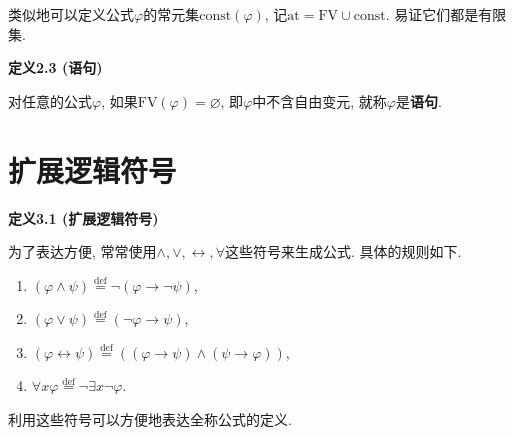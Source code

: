 \documentclass[UTF8]{ctexart}
\begin{document}
\vspace{10pt}

类似地可以定义公式$\varphi$的常元集$\mathrm{const}(\varphi)$,
记$\mathrm{at}=\mathrm{FV}\cup\mathrm{const}$. 易证它们都是有限集.

\vspace{10pt}

\hypertarget{sec:定义2.3}{}
\noindent\textbf{定义2.3 (语句)}

对任意的公式$\varphi$, 如果$\mathrm{FV}(\varphi)=\varnothing$,
即$\varphi$中不含自由变元, 就称$\varphi$是\textbf{语句}.

\vspace{20pt}





\section{扩展逻辑符号}

\hypertarget{sec:定义3.1}{}
\noindent\textbf{定义3.1 (扩展逻辑符号)}

为了表达方便, 常常使用$\land,\lor,\leftrightarrow,\forall$这些符号来生成公式.
具体的规则如下.
\begin{enumerate}
    \item $(\varphi\land\psi)\overset{\mathrm{def}}{=}\neg(\varphi\to\neg\psi)$,
    \item $(\varphi\lor\psi)\overset{\mathrm{def}}{=}(\neg\varphi\to\psi)$,
    \item $(\varphi\leftrightarrow\psi)\overset{\mathrm{def}}{=}
    ((\varphi\to\psi)\land(\psi\to\varphi))$,
    \item $\forall x\varphi\overset{\mathrm{def}}{=}\neg\exists x\neg\varphi$.
\end{enumerate}

\vspace{10pt}

利用这些符号可以方便地表达全称公式的定义.
\end{document}
